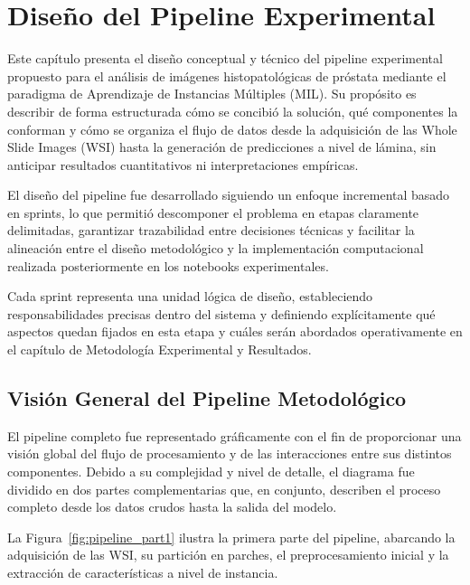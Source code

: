 
\section{Diseño del Pipeline Experimental}
\label{sec:diseno_pipeline}

Este capítulo presenta el diseño conceptual y técnico del pipeline experimental propuesto para el análisis de imágenes histopatológicas de próstata mediante el paradigma de Aprendizaje de Instancias Múltiples (MIL). Su propósito es describir de forma estructurada cómo se concibió la solución, qué componentes la conforman y cómo se organiza el flujo de datos desde la adquisición de las Whole Slide Images (WSI) hasta la generación de predicciones a nivel de lámina, sin anticipar resultados cuantitativos ni interpretaciones empíricas.\newline

El diseño del pipeline fue desarrollado siguiendo un enfoque incremental basado en sprints, lo que permitió descomponer el problema en etapas claramente delimitadas, garantizar trazabilidad entre decisiones técnicas y facilitar la alineación entre el diseño metodológico y la implementación computacional realizada posteriormente en los notebooks experimentales.\newline

Cada sprint representa una unidad lógica de diseño, estableciendo responsabilidades precisas dentro del sistema y definiendo explícitamente qué aspectos quedan fijados en esta etapa y cuáles serán abordados operativamente en el capítulo de Metodología Experimental y Resultados.\newline

\subsection{Visión General del Pipeline Metodológico}
\label{subsec:vision_general_pipeline}

El pipeline completo fue representado gráficamente con el fin de proporcionar una visión global del flujo de procesamiento y de las interacciones entre sus distintos componentes. Debido a su complejidad y nivel de detalle, el diagrama fue dividido en dos partes complementarias que, en conjunto, describen el proceso completo desde los datos crudos hasta la salida del modelo.\newline

La Figura~\ref{fig:pipeline_part1} ilustra la primera parte del pipeline, abarcando la adquisición de las WSI, su partición en parches, el preprocesamiento inicial y la extracción de características a nivel de instancia.\newline

